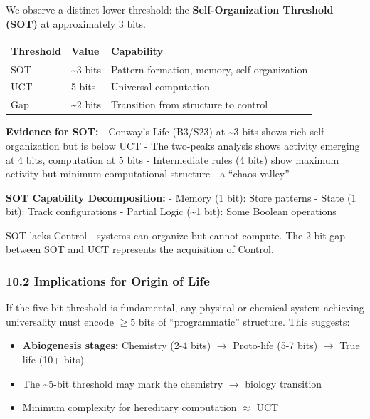 \documentclass[
  11pt,
]{article}
\providecommand{\tightlist}{%
  \setlength{\itemsep}{0pt}\setlength{\parskip}{0pt}}
\begin{document}
We observe a distinct lower threshold: the \textbf{Self-Organization
Threshold (SOT)} at approximately 3 bits.

\begin{longtable}[]{@{}lll@{}}
\toprule\noalign{}
Threshold & Value & Capability \\
\midrule\noalign{}
\endhead
\bottomrule\noalign{}
\endlastfoot
SOT & \textasciitilde3 bits & Pattern formation, memory,
self-organization \\
UCT & 5 bits & Universal computation \\
Gap & \textasciitilde2 bits & Transition from structure to control \\
\end{longtable}

\textbf{Evidence for SOT:} - Conway's Life (B3/S23) at \textasciitilde3
bits shows rich self-organization but is below UCT - The two-peaks
analysis shows activity emerging at 4 bits, computation at 5 bits -
Intermediate rules (4 bits) show maximum activity but minimum
computational structure---a ``chaos valley''

\textbf{SOT Capability Decomposition:} - Memory (1 bit): Store patterns
- State (1 bit): Track configurations - Partial Logic (\textasciitilde1
bit): Some Boolean operations

SOT lacks Control---systems can organize but cannot compute. The 2-bit
gap between SOT and UCT represents the acquisition of Control.

\hypertarget{implications-for-origin-of-life}{%
\subsubsection{10.2 Implications for Origin of
Life}\label{implications-for-origin-of-life}}

If the five-bit threshold is fundamental, any physical or chemical
system achieving universality must encode $\geq$5 bits of ``programmatic''
structure. This suggests:

\begin{itemize}
\tightlist
\item
  \textbf{Abiogenesis stages:} Chemistry (2-4 bits) $\rightarrow$ Proto-life (5-7
  bits) $\rightarrow$ True life (10+ bits)
\item
  The \textasciitilde5-bit threshold may mark the chemistry $\rightarrow$ biology
  transition
\item
  Minimum complexity for hereditary computation $\approx$ UCT
\end{itemize}
\end{document}
